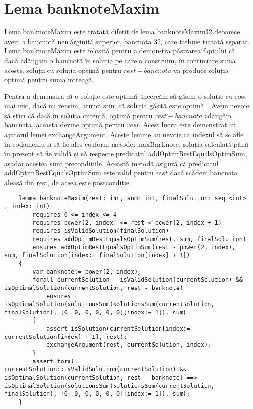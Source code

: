     \section{Lema banknoteMaxim}
    Lema banknoteMaxim este tratată diferit de lema banknoteMaxim32 deoarece avem o bancnotă nemărginită superior, bancnota 32,
    care trebuie tratată separat.
    Lema banknoteMaxim este folosită pentru a demonstra păstrarea faptului că dacă adăugam o bancnotă în soluția pe care o 
    construim, în continuare suma acestei soluții cu soluția optimă pentru $ rest - bancnota$ va produce soluția 
    optimă pentru suma întreagă.\par
    Pentru a demonstra că o soluție este optimă, încercăm să găsim o soluție cu cost mai mic, dacă nu reușim, atunci 
    știm că soluția găsită este optimă~\cite{kozen1993optimal}.
    Avem nevoie să știm că dacă în soluția curentă, optimă pentru $ rest - bancnota$  
    adaugăm bancnota, aceasta devine optimă pentru $rest$. Acest lucru este demonstrat cu ajutorul lemei exchangeArgument.
    Aceste lemme au nevoie ca indexul să se afle în codomeniu și să fie ales conform metodei maxBanknote, soluția calculată până 
    în prezent să fie validă și să respecte predicatul addOptimRestEqualsOptimSum, așadar acestea sunt precondițiile.
    Această metodă asigură că predicatul addOptimRestEqualsOptimSum este valid pentru $rest $ dacă scădem bancnota aleasă din rest, 
    de aceea este postcondiție.
    \begin{lstlisting}
    lemma banknoteMaxim(rest: int, sum: int, finalSolution: seq <int> , index: int)
        requires 0 <= index <= 4
        requires power(2, index) <= rest < power(2, index + 1)
        requires isValidSolution(finalSolution)
        requires addOptimRestEqualsOptimSum(rest, sum, finalSolution)
        ensures addOptimRestEqualsOptimSum(rest - power(2, index), sum, finalSolution[index:= finalSolution[index] + 1]) 
    {
        var banknote:= power(2, index);
        forall currentSolution | isValidSolution(currentSolution) && isOptimalSolution(currentSolution, rest - banknote)
            ensures isOptimalSolution(solutionsSum(solutionsSum(currentSolution, finalSolution), [0, 0, 0, 0, 0, 0][index:= 1]), sum) 
        {
            assert isSolution(currentSolution[index:= currentSolution[index] + 1], rest);
            exchangeArgument(rest, currentSolution, index);
        }
        assert forall currentSolution::isValidSolution(currentSolution) && isOptimalSolution(currentSolution, rest - banknote) ==> isOptimalSolution(solutionsSum(solutionsSum(currentSolution, finalSolution), [0, 0, 0, 0, 0, 0][index:= 1]), sum);
    }
    \end{lstlisting}



